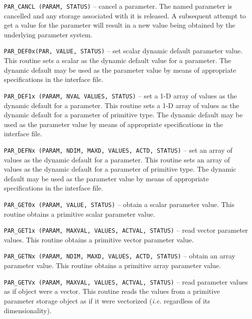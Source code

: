 \begin{description}

\item{\tt PAR\_CANCL (PARAM, STATUS)}
 -- cancel a parameter.
The named parameter is cancelled and any storage associated
with it is released. A subsequent attempt to get a value for the
parameter will result in a new value being obtained by the
underlying parameter system.

\item{\tt PAR\_DEF0x(PAR, VALUE, STATUS)}
-- set scalar dynamic default parameter value.
This routine sets a scalar as the dynamic default value for a
parameter. The dynamic default may be used as the parameter
value by means of appropriate specifications in the interface file.

\item{\tt PAR\_DEF1x (PARAM, NVAL VALUES, STATUS)}
-- set a 1-D array of values as the dynamic default for a parameter.
This routine sets a 1-D array of values as the dynamic default for
a parameter of primitive type. The dynamic default may be used as
the parameter value by  means of appropriate specifications in the interface
file.


\item{\tt PAR\_DEFNx (PARAM, NDIM, MAXD, VALUES, ACTD, STATUS)}
-- set an array of values as the dynamic default for a parameter.
This routine sets an array of values as the dynamic default for
a parameter of primitive type. The dynamic default may be used
as the parameter value by  means of appropriate specifications in the
interface file.


\item{\tt PAR\_GET0x (PARAM, VALUE, STATUS)}
-- obtain a scalar parameter value.
This routine obtains a primitive scalar parameter value.


\item{\tt PAR\_GET1x (PARAM, MAXVAL, VALUES, ACTVAL, STATUS)}
-- read vector parameter values.
This routine obtains a primitive vector parameter value.


\item{\tt PAR\_GETNx (PARAM, NDIM, MAXD, VALUES, ACTD, STATUS)}
-- obtain an array parameter value.
This routine obtains a primitive array parameter value.



\item{\tt PAR\_GETVx (PARAM, MAXVAL, VALUES, ACTVAL, STATUS)}
-- read parameter values as if object were a vector.
This routine reads the values from a primitive parameter storage
object as if it were vectorized ({\it i.e.} regardless of its dimensionality).


\end{description}
